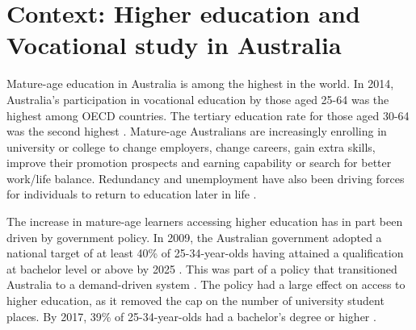 \documentclass[12pt, a4paper]{article}
\begin{document}
%
%
\section{Context: Higher education and Vocational study in Australia}

Mature-age education in Australia is among the highest in the world. In 2014, Australia’s participation in vocational education by those aged 25-64 was the highest among OECD countries. The tertiary education rate for those aged 30-64 was the second highest \citep{perales2017}. Mature-age Australians are increasingly enrolling in university or college to change employers, change careers, gain extra skills, improve their promotion prospects and earning capability or search for better work/life balance. Redundancy and unemployment have also been driving forces for individuals to return to education later in life \citep{coelli2012}.

The increase in mature-age learners accessing higher education has in part been driven by government policy. In 2009, the Australian government adopted a national target of at least 40\% of 25-34-year-olds having attained a qualification at bachelor level or above by 2025 \citep{oshea2015}. This was part of a policy that transitioned Australia to a demand-driven system \citep{ua2020}. The policy had a large effect on access to higher education, as it removed the cap on the number of university student places. By 2017, 39\% of 25-34-year-olds had a bachelor’s degree or higher \citep{caruso2018}.
\end{document}
